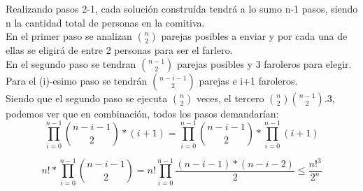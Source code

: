 \vspace*{1em}

Realizando pasos 2-1, cada solución construída tendrá a lo sumo n-1 pasos, siendo n la cantidad total de personas en la comitiva.\\

En el primer paso se analizan $\binom  {n} {2}$ parejas posibles a enviar y por cada una de ellas se eligirá de entre 2 personas para ser el farlero.\\

En el segundo paso se tendran $\binom  {n-1} {2}$ parejas posibles y 3 faroleros para elegir.\\

Para el (i)-esimo paso se tendrán $\binom  {n-i-1} {2}$ parejas e i+1 faroleros.\\

Siendo que el segundo paso se ejecuta $\binom  {n} {2}$ veces, el tercero $\binom  {n} {2} \binom{n-1} {2}.3$, podemos ver que en combinación, todos los pasos demandarían:
\[
\prod_{i=0}^{n-1}\binom {n-i-1}{2}*(i+1) = \prod_{i=0}^{n-1}\binom {n-i-1}{2} * \prod_{i=0}^{n-1}(i+1)
\]

\[
n! * \prod_{i=0}^{n-1}\binom {n-i-1}{2} = n! \prod_{i=0}^{n-1}\frac{(n-i-1)*(n-i-2)}{2} \leq \frac{n!^{3}}{2^{n}} 
\]